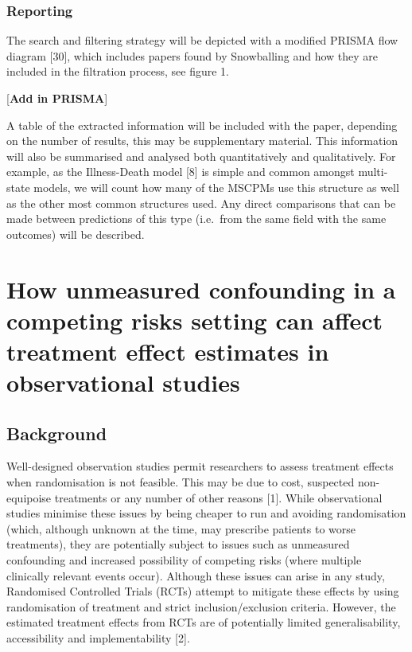 \documentclass[12pt,twoside]{reedthesis}
\begin{document}
\hypertarget{reporting}{%
\subsection{Reporting}\label{reporting}}

The search and filtering strategy will be depicted with a modified PRISMA flow diagram {[}30{]}, which includes papers found by Snowballing and how they are included in the filtration process, see figure 1.

{[}\textbf{Add in PRISMA}{]}

A table of the extracted information will be included with the paper, depending on the number of results, this may be supplementary material. This information will also be summarised and analysed both quantitatively and qualitatively. For example, as the Illness-Death model {[}8{]} is simple and common amongst multi-state models, we will count how many of the MSCPMs use this structure as well as the other most common structures used. Any direct comparisons that can be made between predictions of this type (i.e.~from the same field with the same outcomes) will be described.

\hypertarget{chap-Conf-CR}{%
\chapter{How unmeasured confounding in a competing risks setting can affect treatment effect estimates in observational studies}\label{chap-Conf-CR}}

\hypertarget{background}{%
\section{Background}\label{background}}

Well-designed observation studies permit researchers to assess treatment effects when randomisation is not feasible. This may be due to cost, suspected non-equipoise treatments or any number of other reasons {[}1{]}. While observational studies minimise these issues by being cheaper to run and avoiding randomisation (which, although unknown at the time, may prescribe patients to worse treatments), they are potentially subject to issues such as unmeasured confounding and increased possibility of competing risks (where multiple clinically relevant events occur). Although these issues can arise in any study, Randomised Controlled Trials (RCTs) attempt to mitigate these effects by using randomisation of treatment and strict inclusion/exclusion criteria. However, the estimated treatment effects from RCTs are of potentially limited generalisability, accessibility and implementability {[}2{]}.
\end{document}
